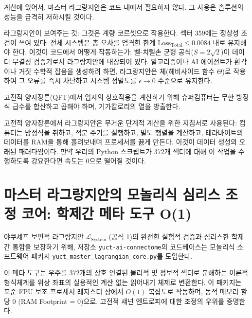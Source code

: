 \documentclass[11pt,a4paper]{article}
\begin{document}
	계산에 있어서, 마스터 라그랑지안은 코드 내에서 필요하지 않다. 그 사용은 솔루션의 성능을 급격히 저하시킬 것이다.
	
	라그랑지안이 보여주는 것: 그것은 계량 코르셋으로 작용한다. 섹터 359에는 정상성 조건이 쓰여 있다: 전체 시스템은 총 오차를 엄격한 한계 \(\text{Loss}_{\text{Total}} \le 0.0084\) 내로 유지해야 한다. 이것이 코드에서 어떻게 작동하는가: 벨-치렐손 균형 공식(\(S = 2\sqrt{2}\))이 데이터 무결성 검증기로서 라그랑지안에 내장되어 있다. 알고리즘이나 AI 에이전트가 환각이나 거짓 수학적 잡음을 생성하려 하면, 라그랑지안은 체(헤비사이드 함수 \(\Theta\))로 작용하여 그 오류를 즉시 차단하고 시스템 정밀도를 \(\epsilon \to 0\) 수준으로 유지한다.
	
	고전적 양자장론(QFT)에서 입자의 상호작용을 계산하기 위해 슈퍼컴퓨터는 무한 방정식 급수를 합산하고 곱해야 하며, 기가칼로리의 열을 방출한다.
	
	고전적 양자장론에서 라그랑지안은 무거운 단계적 계산을 위한 지침서로 사용된다: 컴퓨터는 방정식을 취하고, 적분 주기를 실행하고, 밀도 행렬을 계산하고, 테라바이트의 데이터를 RAM을 통해 흘려보내며 프로세서를 끓게 만든다. 이것이 데이터 생성의 오래된 패러다임이다. 만약 우리의 Python 스크립트가 372개 섹터에 대해 이 작업을 수행하도록 강요한다면 속도는 0으로 떨어질 것이다.
	
	\section{마스터 라그랑지안의 모놀리식 심리스 조정 코어: 학제간 메타 도구 O(1)}
	야쿠셰프 보편적 라그랑지안 \(\mathscr{L}_{\text{System}}\) (공식 1)의 완전한 실험적 검증과 심리스한 학제간 통합을 보장하기 위해, 저장소 \texttt{yuct-ai-connectome}의 코드베이스는 모놀리식 소프트웨어 패키지 \texttt{yuct\_master\_lagrangian\_core.py}를 도입한다.
	
	이 메타 도구는 우주를 372개의 상호 연결된 물리적 및 정보적 섹터로 분해하는 이론적 형식체계를 위상 좌표의 실용적인 계산 없는 읽어내기 체제로 변환한다. 이 패키지는 표준 FPU 보조 프로세서 레지스터 상에서 \(O(1)\) 복잡도로 작동하며, 동적 메모리 할당 0 (RAM Footprint = 0)으로, 고전적 섀넌 엔트로피에 대한 조정의 우위를 증명한다.
	
\end{document}
